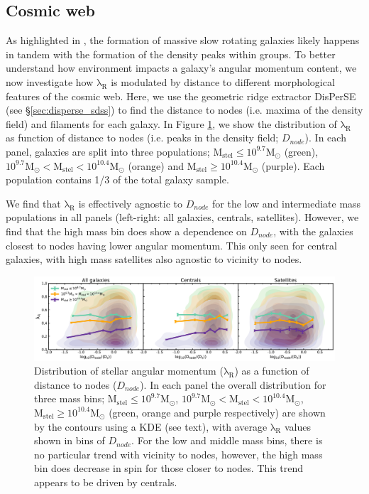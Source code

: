 \subsection{Cosmic web}
As highlighted in \citep{graham2019}, the formation of massive slow rotating galaxies likely happens in tandem with the formation of the density peaks within groups. To better understand how environment impacts a galaxy's angular momentum content, we now investigate how $\mathrm{\lambda_R}$ is modulated by distance to different morphological features of the cosmic web. Here, we use the geometric ridge extractor DisPerSE (see \S\ref{sec:disperse_sdss}) to find the distance to nodes (i.e. maxima of the density field) and filaments for each galaxy. In Figure \ref{fig:lambdaR_dnode}, we show the distribution of $\mathrm{\lambda_R}$ as function of distance to nodes (i.e. peaks in the density field; $D_{node}$). In each panel, galaxies are split into three populations; $\mathrm{M_{stel} \leq 10^{9.7}M_{\odot}}$ (green), $\mathrm{10^{9.7}M_{\odot} < M_{stel} < 10^{10.4}M_{\odot}}$ (orange) and $\mathrm{M_{stel} \geq 10^{10.4}M_{\odot}}$ (purple). Each population contains 1/3 of the total galaxy sample. 

We find that $\mathrm{\lambda_R}$ is effectively agnostic to $D_{node}$ for the low and intermediate mass populations in all panels (left-right: all galaxies, centrals, satellites). However, we find that the high mass bin does show a dependence on $D_{node}$, with the galaxies closest to nodes having lower angular momentum. This only seen for central galaxies, with high mass satellites also agnostic to vicinity to nodes. 

\begin{figure}
    \centering\includegraphics[width=\linewidth]{thesis/latex/cw_spin/lambdaR_dnode_mass_split_3sigma.pdf}
    \caption{Distribution of stellar angular momentum ($\mathrm{\lambda_R}$) as a function of distance to nodes ($D_{node}$). In each panel the overall distribution for three mass bins; $\mathrm{M_{stel} \leq 10^{9.7} M_{\odot}}$, $\mathrm{10^{9.7}M_{\odot} < M_{stel} < 10^{10.4}M_{\odot}}$, $\mathrm{M_{stel} \geq 10^{10.4}M_{\odot}}$ (green, orange and purple respectively) are shown by the contours using a KDE (see text), with average $\mathrm{\lambda_R}$ values shown in bins of $D_{node}$. For the low and middle mass bins, there is no particular trend with vicinity to nodes, however, the high mass bin does decrease in spin for those closer to nodes. This trend appears to be driven by centrals.}
\label{fig:lambdaR_dnode}
\end{figure} 

